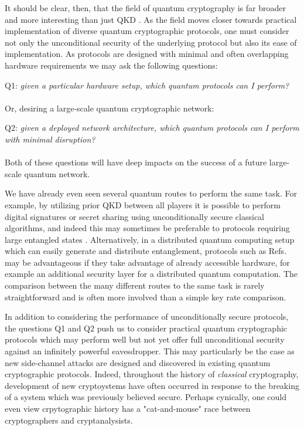 It should be clear, then, that the field of quantum cryptography is far broader and more interesting than just QKD \cite{Broadbent2015}. As the field moves closer towards practical implementation of diverse quantum cryptographic protocols, one must consider not only the unconditional security of the underlying protocol but also its ease of implementation. As protocols are designed with minimal and often overlapping hardware requirements we may ask the following questions:
\\
\par
Q1:\emph{ given a particular hardware setup, which quantum protocols can I perform?}
\\
\\
\noindent Or, desiring a large-scale quantum cryptographic network:
\\
\par
Q2:\emph{ given a deployed network architecture, which quantum protocols can I perform with minimal disruption?}
\\
\\
\noindent Both of these questions will have deep impacts on the success of a future large-scale quantum network. %

We have already even seen several quantum routes to perform the same task. For example, by utilizing prior QKD between all players it is possible to perform digital signatures \cite{Wallden2015, Amiri2016a} or secret sharing \cite{Schneier1996} using unconditionally secure classical algorithms, and indeed this may sometimes be preferable to protocols requiring large entangled states \cite{Gottesman2001, Hillery1999}. Alternatively, in a distributed quantum computing setup which can easily generate and distribute entanglement, protocols such as Refs.~\cite{Bell2014, Kogias2017} may be advantageous if they take advantage of already accessible hardware, for example an additional security layer for a distributed quantum computation. The comparison between the many different routes to the same task is rarely straightforward and is often more involved than a simple key rate comparison. 

In addition to considering the performance of unconditionally secure protocols, the questions Q1 and Q2 push us to consider practical quantum cryptographic protocols which may perform well but not yet offer full unconditional security against an infinitely powerful eavesdropper. This may particularly be the case as new side-channel attacks are designed and discovered in existing quantum cryptographic protocols. Indeed, throughout the history of \emph{classical} cryptography, development of new cryptoystems have often occurred in response to the breaking of a system which was previously believed secure. Perhaps cynically, one could even view crpytographic history has a "cat-and-mouse" race between cryptographers and cryptanalysists.%


